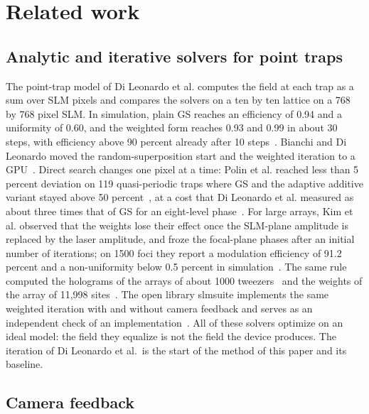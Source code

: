 \section{Related work}\label{sec:related}

\subsection{Analytic and iterative solvers for point traps}

The point-trap model of Di Leonardo et al. computes the field at each trap as a sum over SLM pixels and compares the solvers on a ten by ten lattice on a 768 by 768 pixel SLM. In simulation,
plain GS reaches an efficiency of 0.94 and a uniformity of 0.60, and the weighted form reaches 0.93 and 0.99 in about 30 steps, with efficiency above 90 percent already after 10 steps~\cite{dileonardo}. Bianchi and
Di Leonardo moved the random-superposition start and the weighted iteration to a GPU~\cite{bianchi}. Direct search changes one pixel at a time: Polin et al. reached less than 5 percent deviation on 119 quasi-periodic
traps where GS and the adaptive additive variant stayed above 50 percent~\cite{polin}, at a cost that Di Leonardo et al. measured as about three times that of GS for an eight-level phase~\cite{dileonardo}.
For large arrays, Kim et al. observed that the weights lose their effect once the SLM-plane amplitude is replaced by the laser amplitude, and froze the focal-plane phases after an initial number of iterations; on 1500 foci they
report a modulation efficiency of 91.2 percent and a non-uniformity below 0.5 percent in simulation~\cite{kim2019}. The same rule computed the holograms of the arrays of about 1000 tweezers~\cite{ebadi} and the weights of the
array of 11,998 sites~\cite{manetsch}. The open library slmsuite implements the same weighted iteration with and without camera feedback and serves as an independent check of an implementation~\cite{slmsuite}. All of
these solvers optimize on an ideal model: the field they equalize is not the field the device produces. The iteration of Di Leonardo et al.\ is the start of the method of this paper and its baseline.

\subsection{Camera feedback}

